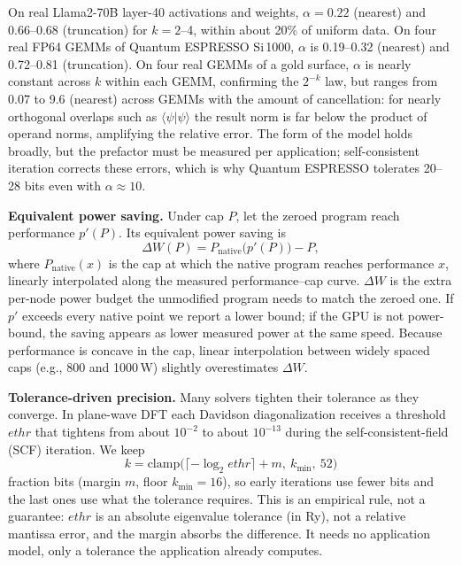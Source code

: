 \documentclass[conference]{IEEEtran}
\newcommand{\W}{\,W}
\newcommand{\pct}{\%}
\begin{document}
On real Llama2-70B layer-40 activations and weights, $\alpha=0.22$ (nearest) and 0.66--0.68 (truncation) for
$k=2$--4, within about 20\pct{} of uniform data. On four real FP64 GEMMs of Quantum ESPRESSO Si\,1000, $\alpha$ is
0.19--0.32 (nearest) and 0.72--0.81 (truncation). On four real GEMMs of a gold surface, $\alpha$ is nearly constant
across $k$ within each GEMM, confirming the $2^{-k}$ law, but ranges from 0.07 to 9.6 (nearest) across GEMMs
with the amount of cancellation: for nearly orthogonal overlaps such as $\langle\psi|\psi\rangle$ the result norm is
far below the product of operand norms, amplifying the relative error. The form of the model holds broadly, but the
prefactor must be measured per application; self-consistent iteration corrects these errors, which is why Quantum
ESPRESSO tolerates 20--28 bits even with $\alpha\approx 10$.

\textbf{Equivalent power saving.} Under cap $P$, let the zeroed program reach performance $p'(P)$. Its equivalent
power saving is
\begin{equation}
\Delta W(P) = P_\mathrm{native}\bigl(p'(P)\bigr) - P,
\end{equation}
where $P_\mathrm{native}(x)$ is the cap at which the native program reaches performance $x$, linearly interpolated
along the measured performance--cap curve. $\Delta W$ is the extra per-node power budget the unmodified program
needs to match the zeroed one. If $p'$ exceeds every native point we report a lower bound; if the GPU is not
power-bound, the saving appears as lower measured power at the same speed. Because performance is concave in the
cap, linear interpolation between widely spaced caps (e.g., 800 and 1000\W) slightly overestimates $\Delta W$.

\textbf{Tolerance-driven precision.} Many solvers tighten their tolerance as they converge. In plane-wave DFT each
Davidson diagonalization receives a threshold $\mathit{ethr}$ that tightens from about $10^{-2}$ to about $10^{-13}$
during the self-consistent-field (SCF) iteration. We keep
\begin{equation}
k = \mathrm{clamp}\bigl(\lceil -\log_2 \mathit{ethr}\rceil + m,\ k_{\min},\ 52\bigr)
\end{equation}
fraction bits (margin $m$, floor $k_{\min}=16$), so early iterations use fewer bits and the last ones use what the
tolerance requires. This is an empirical rule, not a guarantee: $\mathit{ethr}$ is an absolute eigenvalue tolerance
(in Ry), not a relative mantissa error, and the margin absorbs the difference. It needs no application model, only
a tolerance the application already computes.
\end{document}
